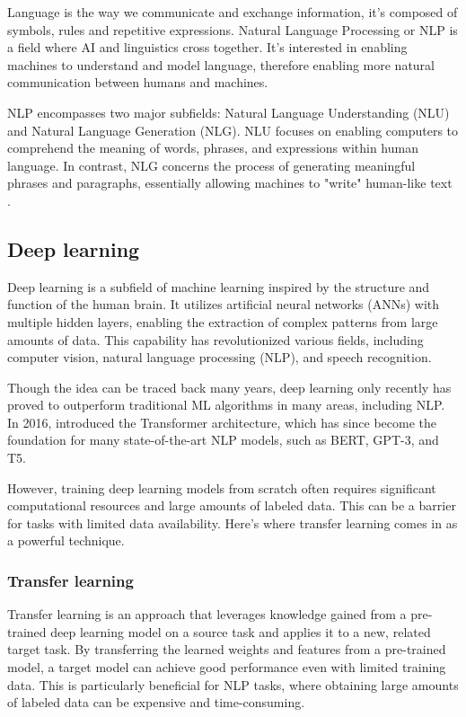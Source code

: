 \documentclass[12.5pt]{article}
\begin{document}
Language is the way we communicate and exchange information, it’s composed of symbols, rules and repetitive expressions. Natural Language Processing or NLP is a field where AI and linguistics cross together. It's interested in enabling machines to understand and model language, therefore enabling more natural communication between humans and machines.

NLP encompasses two major subfields: Natural Language Understanding (NLU) and Natural Language Generation (NLG). NLU focuses on enabling computers to comprehend the meaning of words, phrases, and expressions within human language. In contrast, NLG concerns the process of generating meaningful phrases and paragraphs, essentially allowing machines to "write" human-like text \cite{Khurana2023}.

\subsection{Deep learning}

Deep learning is a subfield of machine learning inspired by the structure and function of the human brain. It utilizes artificial neural networks (ANNs) with multiple hidden layers, enabling the extraction of complex patterns from large amounts of data. This capability has revolutionized various fields, including computer vision, natural language processing (NLP), and speech recognition.

Though the idea can be traced back many years, deep learning only recently has proved to outperform traditional ML algorithms in many areas, including NLP. In 2016, \cite{Vaswani2017} introduced the Transformer architecture, which has since become the foundation for many state-of-the-art NLP models, such as BERT, GPT-3, and T5.

However, training deep learning models from scratch often requires significant computational resources and large amounts of labeled data. This can be a barrier for tasks with limited data availability. Here's where transfer learning comes in as a powerful technique.

\subsubsection{Transfer learning}

Transfer learning is an approach that leverages knowledge gained from a pre-trained deep learning model on a source task and applies it to a new, related target task. By transferring the learned weights and features from a pre-trained model, a target model can achieve good performance even with limited training data. This is particularly beneficial for NLP tasks, where obtaining large amounts of labeled data can be expensive and time-consuming.
\end{document}
